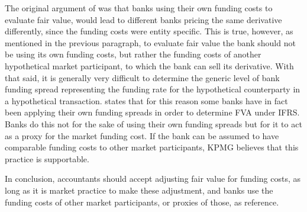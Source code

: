 \documentclass[main.tex]{subfiles}
\begin{document}
            The original argument of \textcite{HullWhiteFVA} was that banks using their own funding costs to evaluate fair value,
            would lead to different banks pricing the same derivative differently,
            since the funding costs were entity specific.
            This is true, however, as mentioned in the previous paragraph,
            to evaluate fair value the bank should not be using its own funding costs, 
            but rather the funding costs of another hypothetical market participant, 
            to which the bank can sell its derivative.
            With that said, it is generally very difficult to determine the generic level of bank funding spread
            representing the funding rate for the hypothetical counterparty in a hypothetical transaction.
            \textcite[Proposition 4]{KPMGFVA} states that for this reason 
            some banks have in fact been applying their own funding spreads in order to determine FVA under IFRS. 
            Banks do this not for the sake of using their own funding spreads
            but for it to act as a proxy for the market funding cost.
            If the bank can be assumed to have comparable funding costs to other market participants,
            KPMG believes that this practice is supportable.

            In conclusion, accountants should accept adjusting fair value for funding costs,
            as long as it is market practice to make these adjustment,
            and banks use the funding costs of other market participants, or proxies of those, as reference.
\end{document}
